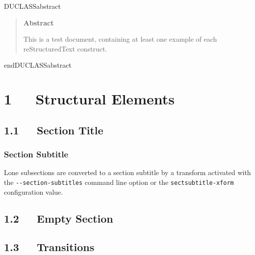\documentclass[a4paper]{article}
\newenvironment{DUclass}[1]%
    {%
     \def\DocutilsClassFunctionName{DUCLASS#1}
     \csname \DocutilsClassFunctionName \endcsname}%
    {\csname end\DocutilsClassFunctionName \endcsname}%
\providecommand*{\DUtitle}[1]{%
  \smallskip\noindent\textbf{#1}\smallskip}
\begin{document}
\begin{DUclass}{abstract}
\begin{quote}
\DUtitle{Abstract}

This is a test document, containing at least one example of each
reStructuredText construct.
\end{quote}
\end{DUclass}




\pagebreak[4] %

\label{table-of-contents}
\renewcommand{\contentsname}{Table of Contents}
\tableofcontents


\section{1   Structural Elements%
  \label{structural-elements}%
}


\subsection{1.1   Section Title%
  \label{section-title}%
}
\subsubsection*{Section Subtitle}

Lone subsections are converted to a section subtitle by a transform
activated with the \texttt{-{}-section-subtitles} command line option or the
\texttt{sectsubtitle-xform} configuration value.


\subsection{1.2   Empty Section%
  \label{empty-section}%
}


\subsection{1.3   Transitions%
  \label{transitions}%
}
\end{document}

